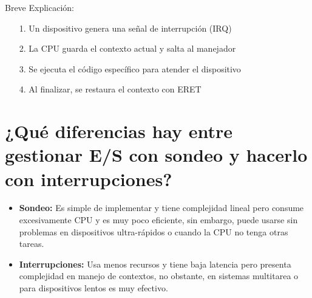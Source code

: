 \documentclass{article}
\begin{document}
\begin{center}
\end{center}

Breve Explicación:

\begin{itemize}
\item[1.] Un dispositivo genera una señal de interrupción (IRQ)
\item[2.] La CPU guarda el contexto actual y salta al manejador
\item[3.] Se ejecuta el código específico para atender el dispositivo
\item[4.] Al finalizar, se restaura el contexto con ERET
\end{itemize}

\section*{¿Qué diferencias hay entre gestionar E/S con sondeo y hacerlo con interrupciones?}

\begin{itemize}
    \item \textbf{Sondeo:} Es simple de implementar y tiene complejidad lineal pero consume excesivamente CPU y es muy poco eficiente, sin embargo, puede usarse sin problemas en dispositivos ultra-rápidos o cuando la CPU no tenga otras tareas.

    \item \textbf{Interrupciones:} Usa menos recursos y tiene baja latencia pero presenta complejidad en manejo de contextos, no obstante, en sistemas multitarea o para dispositivos lentos es muy efectivo.
\end{itemize}
\end{document}
